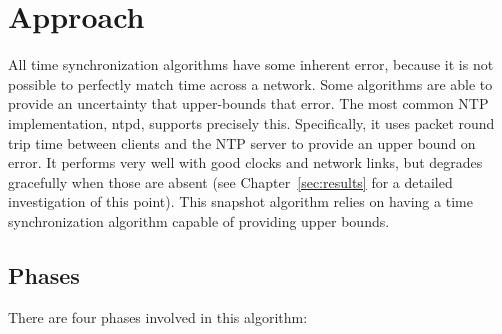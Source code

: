 \chapter{Approach}
\label{sec:approach}

All time synchronization algorithms have some inherent error, because
it is not possible to perfectly match time across a network. Some
algorithms are able to provide an uncertainty that upper-bounds that
error. The most common NTP implementation, ntpd, supports precisely
this. Specifically, it uses packet round trip time between clients and
the NTP server to provide an upper bound on error. It performs very
well with good clocks and network links, but degrades gracefully when
those are absent (see Chapter~\ref{sec:results} for a detailed
investigation of this point). This snapshot algorithm relies on having
a time synchronization algorithm capable of providing upper bounds.


\section{Phases}
There are four phases involved in this algorithm:

